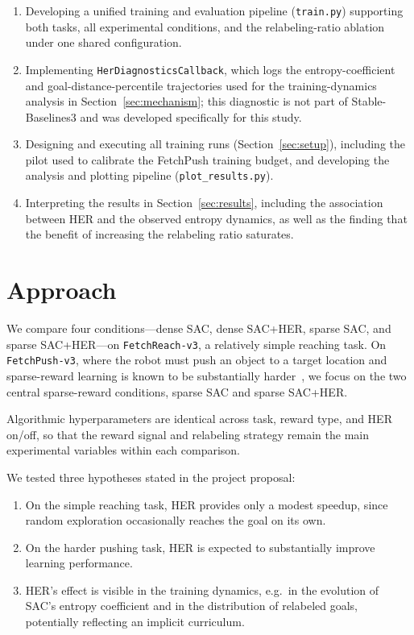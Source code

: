 \documentclass{article}
\begin{document}
\begin{enumerate}
    \item Developing a unified training and evaluation pipeline
    (\texttt{train.py}) supporting both tasks, all experimental conditions,
    and the relabeling-ratio ablation under one shared configuration.

    \item Implementing \texttt{HerDiagnosticsCallback}, which logs the
    entropy-coefficient and goal-distance-percentile trajectories used for the
    training-dynamics analysis in Section~\ref{sec:mechanism}; this diagnostic
    is not part of Stable-Baselines3 and was developed specifically for this
    study.

    \item Designing and executing all training runs (Section~\ref{sec:setup}),
    including the pilot used to calibrate the FetchPush training budget, and
    developing the analysis and plotting pipeline
    (\texttt{plot\_results.py}).

    \item Interpreting the results in Section~\ref{sec:results}, including the
    association between HER and the observed entropy dynamics, as well as the
    finding that the benefit of increasing the relabeling ratio saturates.
\end{enumerate}

\section{Approach}

We compare four conditions---dense SAC, dense SAC+HER, sparse SAC, and
sparse SAC+HER---on \texttt{FetchReach-v3}, a relatively simple reaching
task. On \texttt{FetchPush-v3}, where the robot must push an object to a
target location and sparse-reward learning is known to be substantially
harder~\cite{andrychowicz17}, we focus on the two central sparse-reward
conditions, sparse SAC and sparse SAC+HER.

Algorithmic hyperparameters are identical across task, reward type, and
HER on/off, so that the reward signal and relabeling strategy remain the main
experimental variables within each comparison.

We tested three hypotheses stated in the project proposal:

\begin{enumerate}
    \item[(i)] On the simple reaching task, HER provides only a modest speedup,
    since random exploration occasionally reaches the goal on its own.

    \item[(ii)] On the harder pushing task, HER is expected to substantially
    improve learning performance.

    \item[(iii)] HER's effect is visible in the training dynamics, e.g.\ in the
    evolution of SAC's entropy coefficient and in the distribution of relabeled
    goals, potentially reflecting an implicit curriculum.
\end{enumerate}
\end{document}

